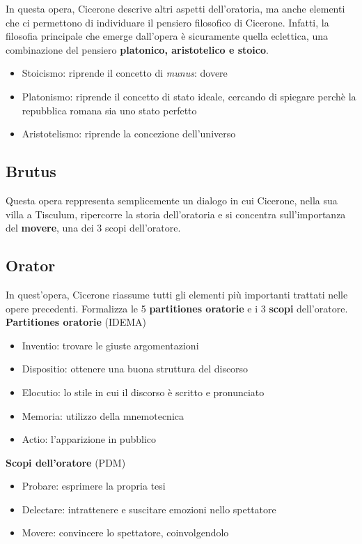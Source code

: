 \documentclass[10pt,a4paper]{article}
\begin{document}
In questa opera, Cicerone descrive altri aspetti dell'oratoria, ma anche elementi che ci permettono di individuare il pensiero filosofico di Cicerone. Infatti, la filosofia principale che emerge dall'opera è sicuramente quella eclettica, una combinazione del pensiero \textbf{platonico, aristotelico e stoico}. 
\begin{itemize}
	\item Stoicismo: riprende il concetto di \textit{munus}: dovere
	\item Platonismo: riprende il concetto di stato ideale, cercando di spiegare perchè la repubblica romana sia uno stato perfetto 
	\item Aristotelismo: riprende la concezione dell'universo 
\end{itemize} 

\subsection*{Brutus}

Questa opera reppresenta semplicemente un dialogo in cui Cicerone, nella sua villa a Tisculum, ripercorre la storia dell'oratoria e si concentra sull'importanza del \textbf{movere}, una dei 3 scopi dell'oratore.

\subsection*{Orator}

In quest'opera, Cicerone riassume tutti gli elementi più importanti trattati nelle opere precedenti. Formalizza le 5 \textbf{partitiones oratorie} e i 3 \textbf{scopi} dell'oratore. \\

\textbf{Partitiones oratorie} (IDEMA)

\begin{itemize}
	\item Inventio: trovare le giuste argomentazioni
	\item Dispositio: ottenere una buona struttura del discorso
	\item Elocutio: lo stile in cui il discorso è scritto e pronunciato
	\item Memoria: utilizzo della mnemotecnica
	\item Actio: l'apparizione in pubblico
\end{itemize} 

\textbf{Scopi dell'oratore} (PDM)

\begin{itemize} 
	\item Probare: esprimere la propria tesi
	\item Delectare: intrattenere e suscitare emozioni nello spettatore
	\item Movere: convincere lo spettatore, coinvolgendolo
\end{itemize}
\end{document}
